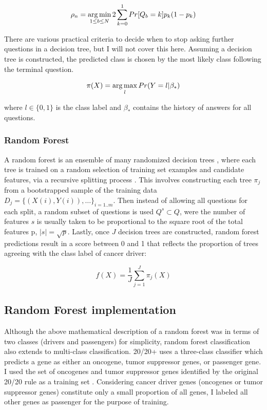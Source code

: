 \begin{equation}
\rho_n=\operatorname*{arg\,min}_{1 \leq b \leq N}{2\sum_{k=0}^{1}{Pr[Q_b=k]p_k(1-p_k)}}
\end{equation}

There are various practical criteria to decide when to stop asking further questions in a decision tree, but I will not cover this here. Assuming a decision tree is constructed, the predicted class is chosen by the most likely class following the terminal question.

\begin{equation}
\pi(X) = \operatorname*{arg\,max}_l{Pr(Y=l|\beta_*)}
\end{equation}

where $l\in \{0,1\}$ is the class label and $\beta_*$ contains the history of answers for all questions. 

\subsubsection{Random Forest}

A random forest is an ensemble of many randomized decision trees \cite{RN41, RN40}, where each tree is trained on a random selection of training set examples and candidate features, via a recursive splitting process \cite{RN89}. This involves constructing each tree $\pi_j$ from a bootstrapped sample of the training data $D_j=\{(X(i),Y(i)),…\}_{i=1..m}$. Then instead of allowing all questions for each split, a random subset of questions is used $Q^s\subset Q$, were the number of features $s$ is usually taken to be proportional to the square root of the total features p,  $|s|=\sqrt{p}$. Lastly, once $J$ decision trees are constructed, random forest predictions result in a score between 0 and 1 that reflects the proportion of trees agreeing with the class label of cancer driver:

\begin{equation}
f(X) = \frac{1}{J}\sum_{j=1}^J{\pi_j(X)}
\end{equation}

\subsection{Random Forest implementation}

Although the above mathematical description of a random forest was in terms of two classes (drivers and passengers) for simplicity, random forest classification also extends to multi-class classification. 20/20+ uses a three-class classifier which predicts a gene as either an oncogene, tumor suppressor genes, or passenger gene. I used the set of oncogenes and tumor suppressor genes identified by the original 20/20 rule as a training set \cite{RN25}. Considering cancer driver genes (oncogenes or tumor suppressor genes) constitute only a small proportion of all genes, I labeled all other genes as passenger for the purpose of training. 

